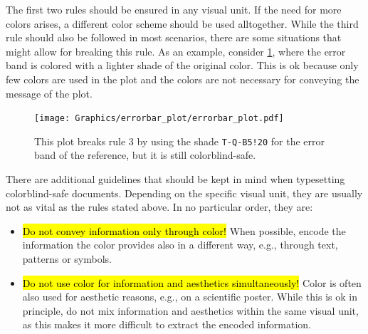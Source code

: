\documentclass{scrartcl}
\newcommand\hlc[2][T-Q-PH4]{{%
    \colorlet{foo}{#1}%
    \sethlcolor{foo}\hl{#2}}%
}
\begin{document}
The first two rules should be ensured in any visual unit. If the need for more colors arises, a different color scheme should be used alltogether.
While the third rule should also be followed in most scenarios, there are some situations that might allow for breaking this rule. As an example, consider \cref{fig:errorbar_plot}, where the error band is colored with a lighter shade of the original color.
This is ok because only few colors are used in the plot and the colors are not necessary for conveying the message of the plot.

\begin{figure}[ht]
    \centering
    \texttt{[image: Graphics/errorbar\_plot/errorbar\_plot.pdf]}
    \cprotect\caption{This plot breaks rule 3 by using the shade \verb?T-Q-B5!20? for the error band of the reference, but it is still colorblind-safe.}
    \label{fig:errorbar_plot}
\end{figure}

There are additional guidelines that should be kept in mind when typesetting colorblind-safe documents.
Depending on the specific visual unit, they are usually not as vital as the rules stated above.
In no particular order, they are:
\begin{itemize}
    \item \hlc{Do not convey information only through color!}\newline
        When possible, encode the information the color provides also in a different way, e.g., through text, patterns or symbols.
    \item \hlc{Do not use color for information and aesthetics simultaneously!}\newline
        Color is often also used for aesthetic reasons, e.g., on a scientific poster.
        While this is ok in principle, do not mix information and aesthetics within the same visual unit, as this makes it more difficult to extract the encoded information.
\end{itemize}
\end{document}

